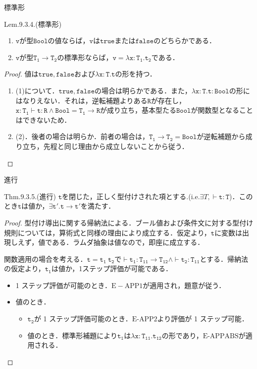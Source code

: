 \documentclass[9pt]{beamer}
\begin{document}
\begin{frame}{標準形}
\begin{alertblock}{Lem.9.3.4.(標準形)}
\begin{enumerate}
\item $\mathtt{v}$が型$\mathtt{Bool}$の値ならば，$\mathtt{v}$は$\mathtt{true}$または$\mathtt{false}$のどちらかである．
\item $\mathtt{v}$が型$\mathtt{T_{1}\rightarrow T_{2}}$の標準形ならば，$\mathtt{v= \lambda x:T_{1}.t_{2}}$である．
\end{enumerate}
\end{alertblock}
\begin{proof}
値は$\mathtt{true,false}$および$\mathtt{\lambda x: T.t}$の形を持つ．\begin{enumerate}
\item (1)について．$\mathtt{true, false}$の場合は明らかである．また，$\mathtt{\lambda x:T. t:Bool}$の形にはなりえない．それは，逆転補題よりある$\mathtt{R}$が存在し，$\mathtt{x:T_{1}\vdash t:R}\land \mathtt{Bool = T_{1}\rightarrow R}$が成り立ち，基本型たる$\mathtt{Bool}$が関数型となることはできないため．
\item (2)．後者の場合は明らか．前者の場合は，$\mathtt{T_{1}\rightarrow T_{2} = Bool}$が逆転補題から成り立ち，先程と同じ理由から成立しないことから従う．
\end{enumerate}
\end{proof}
\end{frame}
\begin{frame}{進行}
\begin{dblock}{Thm.9.3.5.(進行)}
$\mathtt{t}$を閉じた，正しく型付けされた項とする.(i.e.$\exists T, \mathtt{\vdash t:T}$)．このとき$\mathtt{t}$は値か，$\mathtt{\exists t'. t\rightarrow t'}$を満たす．
\end{dblock}
\begin{proof}
型付け導出に関する帰納法による．ブール値および条件文に対する型付け規則については，算術式と同様の理由により成立する．仮定より，$\mathtt{t}$に変数は出現しえず，値である．ラムダ抽象は値なので，即座に成立する．

関数適用の場合を考える．$\mathtt{t = t_{1}\ t_{2}}$で$\vdash\mathtt{t_{1}:T_{11}\rightarrow T_{12}}\land \vdash \mathtt{t_{2}:T_{11}}$とする．帰納法の仮定より，$\mathtt{t_{1}}$は値か，1ステップ評価が可能である．\begin{itemize}
	\item 1 ステップ評価が可能のとき．$\mathrm{E}-\mathrm{APP1}$が適用され，題意が従う．
	\item 値のとき．\begin{itemize}
	\item $\mathtt{t_{2}}$が 1 ステップ評価可能のとき．$\mathrm{E}$-$\mathrm{APP2}$より評価が 1 ステップ可能．
	\item 値のとき．標準形補題により$\mathtt{t_{1}}$は$\mathtt{\lambda x:T_{11}.t_{12}}$の形であり，$\mathrm{E}$-$\mathrm{APPABS}$が適用される．
	\end{itemize}
\end{itemize}
\end{proof}
\end{frame}
\end{document}
